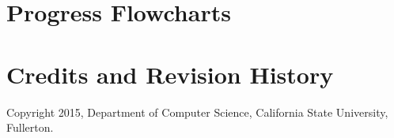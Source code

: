 \documentclass{book}
\begin{document}
\chapter{Progress Flowcharts}

\chapter{Credits and Revision History}

Copyright 2015, Department of Computer Science, California State University, Fullerton.

\cleardoublepage {} \printindex
\end{document}
